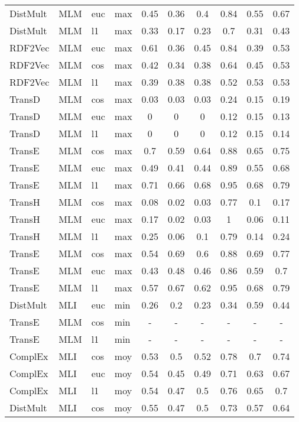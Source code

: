 \begin{longtable}{|llll|ccc|ccc|}
DistMult	&	MLM	&	euc	&	max	&	0.45	&	0.36	&	0.4	&	0.84	&	0.55	&	0.67 \\ 
DistMult	&	MLM	&	l1	&	max	&	0.33	&	0.17	&	0.23	&	0.7	&	0.31	&	0.43 \\ 
RDF2Vec	&	MLM	&	euc	&	max	&	0.61	&	0.36	&	0.45	&	0.84	&	0.39	&	0.53 \\ 
RDF2Vec	&	MLM	&	cos	&	max	&	0.42	&	0.34	&	0.38	&	0.64	&	0.45	&	0.53 \\ 
RDF2Vec	&	MLM	&	l1	&	max	&	0.39	&	0.38	&	0.38	&	0.52	&	0.53	&	0.53 \\ 
TransD	&	MLM	&	cos	&	max	&	0.03	&	0.03	&	0.03	&	0.24	&	0.15	&	0.19 \\ 
TransD	&	MLM	&	euc	&	max	&	0	&	0	&	0	&	0.12	&	0.15	&	0.13 \\ 
TransD	&	MLM	&	l1	&	max	&	0	&	0	&	0	&	0.12	&	0.15	&	0.14 \\ 
TransE	&	MLM	&	cos	&	max	&	0.7	&	0.59	&	0.64	&	0.88	&	0.65	&	0.75 \\ 
TransE	&	MLM	&	euc	&	max	&	0.49	&	0.41	&	0.44	&	0.89	&	0.55	&	0.68 \\ 
TransE	&	MLM	&	l1	&	max	&	0.71	&	0.66	&	0.68	&	0.95	&	0.68	&	0.79 \\ 
TransH	&	MLM	&	cos	&	max	&	0.08	&	0.02	&	0.03	&	0.77	&	0.1	&	0.17 \\ 
TransH	&	MLM	&	euc	&	max	&	0.17	&	0.02	&	0.03	&	1	&	0.06	&	0.11 \\ 
TransH	&	MLM	&	l1	&	max	&	0.25	&	0.06	&	0.1	&	0.79	&	0.14	&	0.24 \\ 
TransE	&	MLM	&	cos	&	max	&	0.54	&	0.69	&	0.6	&	0.88	&	0.69	&	0.77 \\ 
TransE	&	MLM	&	euc	&	max	&	0.43	&	0.48	&	0.46	&	0.86	&	0.59	&	0.7 \\ 
TransE	&	MLM	&	l1	&	max	&	0.57	&	0.67	&	0.62	&	0.95	&	0.68	&	0.79 \\ 
DistMult	&	MLI	&	euc	&	min	&	0.26	&	0.2	&	0.23	&	0.34	&	0.59	&	0.44 \\ 
TransE	&	MLM	&	cos	&	min	&	-	&	-	&	-	&	-	&	-	&	- \\ 
TransE	&	MLM	&	l1	&	min	&	-	&	-	&	-	&	-	&	-	&	- \\ 
ComplEx	&	MLI	&	cos	&	moy	&	0.53	&	0.5	&	0.52	&	0.78	&	0.7	&	0.74 \\ 
ComplEx	&	MLI	&	euc	&	moy	&	0.54	&	0.45	&	0.49	&	0.71	&	0.63	&	0.67 \\ 
ComplEx	&	MLI	&	l1	&	moy	&	0.54	&	0.47	&	0.5	&	0.76	&	0.65	&	0.7 \\ 
DistMult	&	MLI	&	cos	&	moy	&	0.55	&	0.47	&	0.5	&	0.73	&	0.57	&	0.64 \\ 

\end{longtable}
